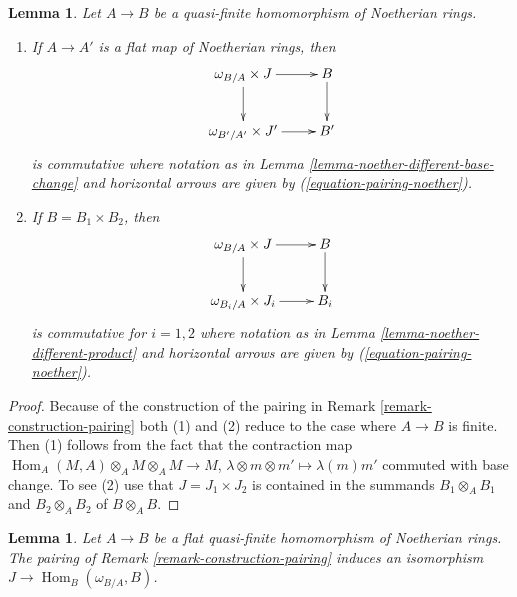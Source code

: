 \documentclass{stacks-project}
\theoremstyle{plain}
\newtheorem{lemma}[subsection]{Lemma}
\theoremstyle{definition}
\theoremstyle{remark}
\numberwithin{equation}{subsection}
\def\Hom{\mathop{\mathrm{Hom}}\nolimits}
\begin{document}
\begin{lemma}
\label{lemma-noether-pairing-compatibilities}
Let $A \to B$ be a quasi-finite homomorphism of Noetherian rings.
\begin{enumerate}
\item If $A \to A'$ is a flat map of Noetherian rings, then
$$
\xymatrix{
\omega_{B/A} \times J \ar[r] \ar[d] & B \ar[d]  \\
\omega_{B'/A'} \times J' \ar[r] & B'
}
$$
is commutative where notation as in
Lemma \ref{lemma-noether-different-base-change}
and horizontal arrows are given by
(\ref{equation-pairing-noether}).
\item If $B = B_1 \times B_2$, then
$$
\xymatrix{
\omega_{B/A} \times J \ar[r] \ar[d] & B \ar[d]  \\
\omega_{B_i/A} \times J_i \ar[r] & B_i
}
$$
is commutative for $i = 1, 2$ where notation as in
Lemma \ref{lemma-noether-different-product}
and horizontal arrows are given by
(\ref{equation-pairing-noether}).
\end{enumerate}
\end{lemma}

\begin{proof}
Because of the construction of the pairing in
Remark \ref{remark-construction-pairing}
both (1) and (2) reduce to the case where $A \to B$ is finite.
Then (1) follows from the fact that the contraction map
$\Hom_A(M, A) \otimes_A M \otimes_A M \to M$,
$\lambda \otimes m \otimes m' \mapsto \lambda(m)m'$
commuted with base change. To see (2) use that
$J = J_1 \times J_2$ is contained in the summands
$B_1 \otimes_A B_1$ and $B_2 \otimes_A B_2$
of $B \otimes_A B$.
\end{proof}

\begin{lemma}
\label{lemma-noether-pairing-flat-quasi-finite}
Let $A \to B$ be a flat quasi-finite homomorphism of Noetherian rings.
The pairing of Remark \ref{remark-construction-pairing} induces an isomorphism
$J \to \Hom_B(\omega_{B/A}, B)$.
\end{lemma}
\end{document}
